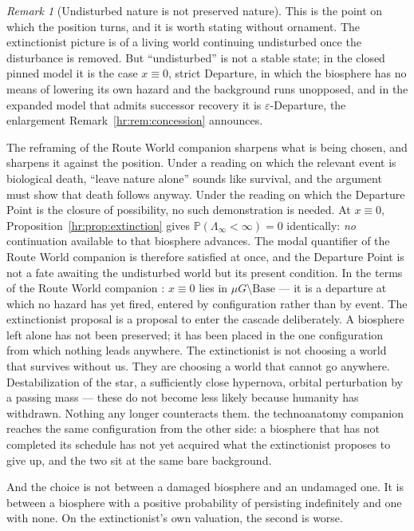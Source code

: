 \documentclass[11pt]{article}
\newcommand{\PP}{\mathbb{P}}
\theoremstyle{plain}
\theoremstyle{definition}
\theoremstyle{remark}
\newtheorem{remark}[theorem]{Remark}
\begin{document}
\begin{remark}[Undisturbed nature is not preserved nature]
\label{hr:rem:undisturbed}
This is the point on which the position turns, and it is worth stating
without ornament. The extinctionist picture is of a living world
continuing undisturbed once the disturbance is removed. But
``undisturbed'' is not a stable state; in the closed pinned model it is
the case $x\equiv0$, strict Departure, in which the biosphere has no
means of lowering its own hazard and the background runs unopposed, and
in the expanded model that admits successor recovery it is
$\varepsilon$-Departure, the enlargement Remark~\ref{hr:rem:concession}
announces.

The reframing of the Route World companion \cite{RouteWorld} sharpens what is
being chosen, and sharpens it against the position. Under a reading on
which the relevant event is biological death, ``leave nature alone''
sounds like survival, and the argument must show that death follows
anyway. Under the reading on which the Departure Point is the closure of
possibility, no such demonstration is needed. At $x\equiv0$,
Proposition~\ref{hr:prop:extinction} gives
$\PP(\Lambda_\infty<\infty)=0$ identically: \emph{no} continuation
available to that biosphere advances. The modal quantifier of
the Route World companion \cite{RouteWorld} is therefore satisfied at once, and
the Departure Point is not a fate awaiting the undisturbed world but
its present condition. In the terms of
the Route World companion \cite{RouteWorld}: $x\equiv0$ lies in
$\mu G\setminus\mathrm{Base}$ --- it is a departure at which no hazard
has yet fired, entered by configuration rather than by event. The
extinctionist proposal is a proposal to enter the cascade
deliberately. A biosphere left alone has not been preserved;
it has been placed in the one configuration from which nothing
leads anywhere. The extinctionist is not choosing a world that
survives without us. They are choosing a world that cannot go
anywhere. Destabilization of the star, a sufficiently
close hypernova, orbital perturbation by a passing mass --- these do not
become less likely because humanity has withdrawn. Nothing any longer
counteracts them. the technoanatomy companion \cite{TechnoC} reaches the same
configuration from the other side: a biosphere that has not completed its
schedule has not yet acquired what the extinctionist proposes to give up,
and the two sit at the same bare background.

And the choice is not between a damaged biosphere and an undamaged one.
It is between a biosphere with a positive probability of persisting
indefinitely and one with none. On the extinctionist's own valuation,
the second is worse.
\end{remark}
\end{document}
